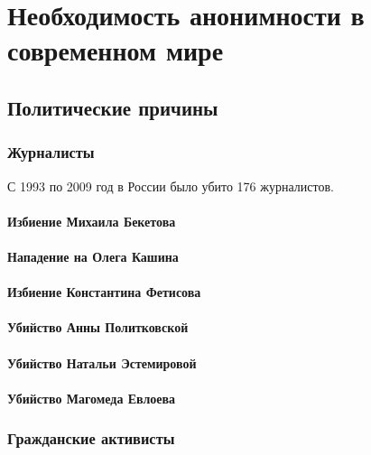 \part{Необходимость анонимности в современном мире}
\chapter{Политические причины}
\section{Журналисты}
С 1993 по 2009 год в России было убито 176 журналистов\cite{kill}.
\subsection{Избиение Михаила Бекетова}
\subsection{Нападение на Олега Кашина}
\subsection{Избиение Константина Фетисова}
\subsection{Убийство Анны Политковской}
\subsection{Убийство Натальи Эстемировой}
\subsection{Убийство Магомеда Евлоева}
\section{Гражданские активисты}